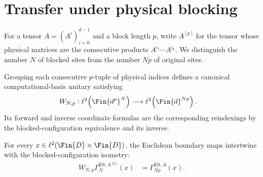 \section{Transfer under physical blocking}\label{sec:blocking_transport}

For a tensor $A=(A^i)_{i=0}^{d-1}$ and a block length $p$, write
$A^{[p]}$ for the tensor whose physical matrices are the consecutive products
$A^{i_1}\cdots A^{i_p}$. We distinguish the number $N$ of blocked sites from
the number $Np$ of original sites.

\begin{definition}
    \label{def:blocked_configuration_isometry}
    \leanok
    Grouping each consecutive $p$-tuple of physical indices defines a canonical
    computational-basis unitary satisfying
    \begin{align}
        W_{N,p} & :\ell^2\!\left(\Fin{d^p}^{N}\right)
        \longrightarrow\ell^2\!\left(\Fin{d}^{Np}\right).
        \label{eq:blocked_configuration_isometry}
    \end{align}
    Its forward and inverse coordinate formulas are the corresponding
    reindexings by the blocked-configuration equivalence and its inverse.
\end{definition}

\begin{lemma}
    \label{lem:blocked_boundary_map_transport}
    \leanok
    For every $x\in\ell^2(\Fin{D}\times\Fin{D})$, the Euclidean boundary maps
    intertwine with the blocked-configuration isometry:
    \begin{align}
        W_{N,p}\Gamma_N^{\mathrm{ES},A^{[p]}}(x)
         & =\Gamma_{Np}^{\mathrm{ES},A}(x).
        \label{eq:blocked_boundary_map_transport}
    \end{align}
\end{lemma}

